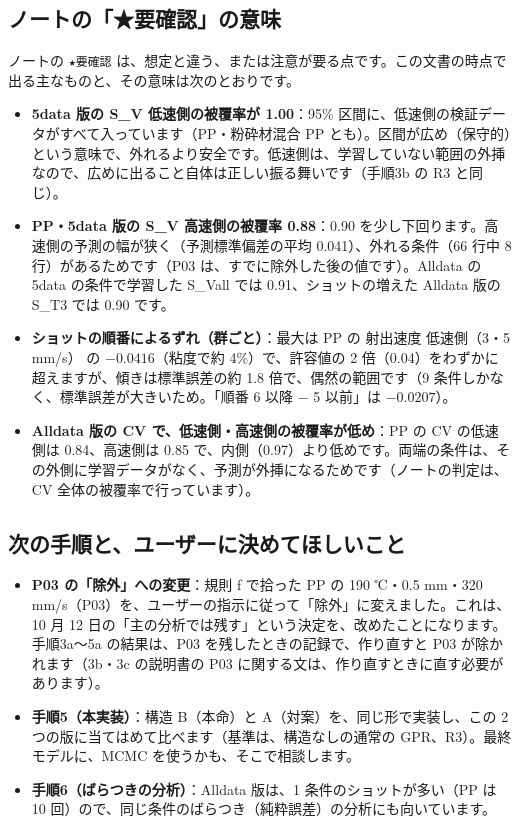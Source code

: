 \documentclass[paper=a4paper,fontsize=10.5pt,line_length=44zw,number_of_lines=38]{jlreq}
\newenvironment{points}{\begin{itemize}[label=$\triangleright$,leftmargin=1.5\zw,itemsep=0.3ex,topsep=0.5ex,parsep=0pt]}{\end{itemize}}
\newcommand{\pt}[1]{\item \textbf{#1}：}
\begin{document}
\subsection{ノートの「★要確認」の意味}
ノートの \texttt{★要確認} は、想定と違う、または注意が要る点です。この文書の時点で出る主なものと、その意味は次のとおりです。
\begin{points}
\pt{5data 版の S\_V 低速側の被覆率が 1.00}95\% 区間に、低速側の検証データがすべて入っています（PP・粉砕材混合 PP とも）。区間が広め（保守的）という意味で、外れるより安全です。低速側は、学習していない範囲の外挿なので、広めに出ること自体は正しい振る舞いです（手順3b の R3 と同じ）。
\pt{PP・5data 版の S\_V 高速側の被覆率 0.88}0.90 を少し下回ります。高速側の予測の幅が狭く（予測標準偏差の平均 0.041）、外れる条件（66 行中 8 行）があるためです（P03 は、すでに除外した後の値です）。Alldata の 5data の条件で学習した S\_Vall では 0.91、ショットの増えた Alldata 版の S\_T3 では 0.90 です。
\pt{ショットの順番によるずれ（群ごと）}最大は PP の 射出速度 低速側（3・5 mm/s） の $-0.0416$（粘度で約 4\%）で、許容値の 2 倍（0.04）をわずかに超えますが、傾きは標準誤差の約 1.8 倍で、偶然の範囲です（9 条件しかなく、標準誤差が大きいため。「順番 6 以降 $-$ 5 以前」は $-0.0207$）。
\pt{Alldata 版の CV で、低速側・高速側の被覆率が低め}PP の CV の低速側は 0.84、高速側は 0.85 で、内側（0.97）より低めです。両端の条件は、その外側に学習データがなく、予測が外挿になるためです（ノートの判定は、CV 全体の被覆率で行っています）。
\end{points}

\subsection{次の手順と、ユーザーに決めてほしいこと}
\begin{points}
\pt{P03 の「除外」への変更}規則 f で拾った PP の 190 ℃・0.5 mm・320 mm/s（P03）を、ユーザーの指示に従って「除外」に変えました。これは、10 月 12 日の「主の分析では残す」という決定を、改めたことになります。手順3a〜5a の結果は、P03 を残したときの記録で、作り直すと P03 が除かれます（3b・3c の説明書の P03 に関する文は、作り直すときに直す必要があります）。
\pt{手順5（本実装）}構造 B（本命）と A（対案）を、同じ形で実装し、この 2 つの版に当てはめて比べます（基準は、構造なしの通常の GPR、R3）。最終モデルに、MCMC を使うかも、そこで相談します。
\pt{手順6（ばらつきの分析）}Alldata 版は、1 条件のショットが多い（PP は 10 回）ので、同じ条件のばらつき（純粋誤差）の分析にも向いています。
\end{points}
\end{document}

